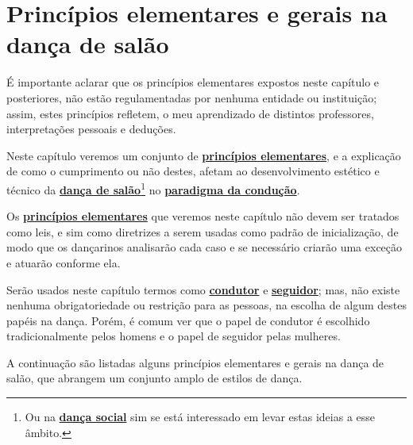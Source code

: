\section{Princípios elementares e gerais na dança de salão}
\label{sec:PrincipioGeral}


\begin{tcbattention}
É importante aclarar
que os princípios elementares expostos neste capítulo e posteriores, 
não estão regulamentadas por nenhuma entidade ou instituição; assim, 
estes princípios refletem, o meu aprendizado de distintos professores,
interpretações pessoais  e deduções. 
\end{tcbattention}

Neste capítulo veremos um conjunto de \hyperref[def:Principio]{\textbf{princípios elementares}}, 
e a explicação de como o cumprimento ou não destes, 
afetam ao desenvolvimento estético e técnico da \hyperref[def:DancaSalao]{\textbf{dança de 
salão}}\footnote{Ou na \hyperref[def:DancaSocial]{\textbf{dança social}} sim se está interessado em levar estas ideias a esse âmbito.}  no \hyperref[def:ParadigmaConducao]{\textbf{paradigma da condução}}.

Os \hyperref[def:Principio]{\textbf{princípios elementares}} que veremos neste capítulo não devem ser
tratados como leis, e sim como diretrizes a serem usadas como padrão de inicialização, de modo que 
os dançarinos analisarão cada caso e se necessário criarão uma exceção e atuarão conforme ela.

Serão usados neste capítulo termos como \hyperref[def:Condutor]{\textbf{condutor}} e \hyperref[def:Seguidor]{\textbf{seguidor}}; 
mas, não existe nenhuma obrigatoriedade ou restrição para as pessoas, 
na escolha de algum destes papéis na dança.
Porém, é comum ver que o papel de condutor é escolhido tradicionalmente pelos homens e o papel de seguidor pelas mulheres.

A continuação são listadas alguns princípios elementares e gerais na dança de salão, 
que abrangem um conjunto amplo de estilos de dança.\\

